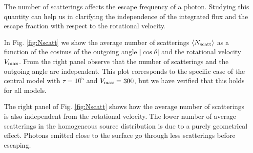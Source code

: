 \documentclass{emulateapj}
\newcommand{\ly}{{\ifmmode{{\rm Ly}\alpha~}\else{Ly$\alpha$~}\fi}}
\newcommand{\kms}{{\ifmmode{{\mathrm{\,km\ s}^{-1}}}\else{\,km~s$^{-1}$}\fi}}
\begin{document}
The number of scatterings affects the escape frequency of a \ly
photon. 
Studying this quantity can help us in clarifying the independence of
the integrated flux and the escape fraction with respect to the
rotational velocity.



In Fig. \ref{fig:Nscatt} we show the average number of scatterings
$\langle N_{\rm scatt}\rangle$ as a function of the cosinus of the
outgoing angle $|\cos\theta|$ and the rotational velocity
$V_{\rm max}$. 
From the right panel observe that the number of scatterings and the
outgoing angle are independent. 
This plot corresponds to the specific case of the central model with
$\tau=10^5$ and $V_{\rm max}=300$\kms, but we have verified that this
holds for all models. 


The right panel of Fig. \ref{fig:Nscatt} shows how the average
number of scatterings is also independent from the rotational
velocity. 
The lower number of average scatterings in the homogeneous source
distribution is due to a purely geometrical effect.
Photons emitted close to the surface go through less scatterings
before escaping.



\end{document}

